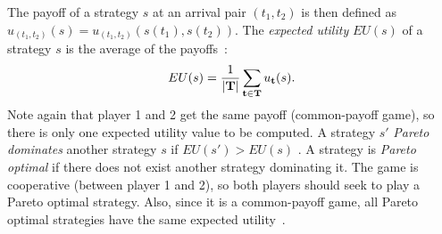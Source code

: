\documentclass[twocolumn,a4paper,superscriptaddress,nofootinbib]{revtex4}
\begin{document}

The payoff of a strategy $s$ at an arrival pair $(t_1,t_2)$ is then defined as $u_{(t_1,t_2)}(s) = u_{(t_1,t_2)} (s(t_1),s(t_2))$.  
The \emph{expected utility} $EU(s)$ of a strategy $s$ is the average of the payoffs~\citep{shoham2008multiagent}:
\[
 EU(s) = \frac{1}{|  {\bf T} |} \sum_{{\bf t} \in \bf T} u_\mathbf{t}(s). %
\]
Note again that player 1 and 2 get the same payoff (common-payoff game), so there is only one expected utility value to be computed. A strategy $s'$ \emph{Pareto dominates} another strategy $s$ if $EU(s') > EU(s)$ \citep{shoham2008multiagent}.
A strategy is \emph{Pareto optimal} if there does not exist another strategy dominating it. %
The game is cooperative (between player 1 and 2), so both players should seek to play a Pareto optimal strategy. Also, since it is a common-payoff game, all Pareto optimal strategies have the same expected utility~\citep{shoham2008multiagent}. 
\end{document}
